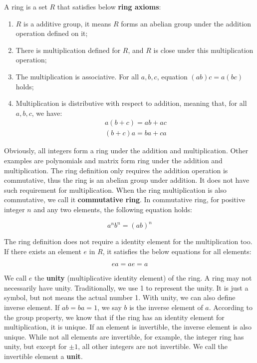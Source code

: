 \documentclass{article}
\begin{document}
\begin{definition}
A ring is a set $R$ that satisfies below \textbf{ring axioms}:
\begin{enumerate}
\item $R$ is a additive group, it means $R$ forms an abelian group under the addition operation defined on it;
\item There is multiplication defined for $R$, and $R$ is close under this multiplication operation;
\item The multiplication is associative. For all $a, b, c$, equation $(ab)c = a(bc)$ holds;
\item Multiplication is distributive with respect to addition, meaning that, for all $a, b, c$, we have:
\[
\begin{array}{l}
a(b + c) = ab + ac \\
(b + c)a = ba + ca
\end{array}
\]
\end{enumerate}
\end{definition}

Obviously, all integers form a ring under the addition and multiplication. Other examples are polynomials and matrix form ring under the addition and multiplication. The ring definition only requires the addition operation is commutative, thus the ring is an abelian group under addition. It does not have such requirement for multiplication. When the ring multiplication is also commutative, we call it \textbf{commutative ring}. In commutative ring, for positive integer $n$ and any two elements, the following equation holds:

\[
a^nb^n = (ab)^n
\]

The ring definition does not require a identity element for the multiplication too. If there exists an element $e$ in $R$, it satisfies the below equations for all elements:

\[
ea = ae = a
\]

We call $e$ the \textbf{unity} (multiplicative identity element) of the ring. A ring may not necessarily have unity. Traditionally, we use 1 to represent the unity. It is just a symbol, but not means the actual number 1. With unity, we can also define inverse element. If $ab = ba = 1$, we say $b$ is the inverse element of $a$. According to the group property, we know that if the ring has an identity element for multiplication, it is unique. If an element is invertible, the inverse element is also unique. While not all elements are invertible, for example, the integer ring has unity, but except for $\pm 1$, all other integers are not invertible. We call the invertible element a \textbf{unit}.
\end{document}
